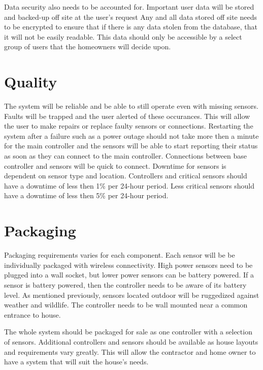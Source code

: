 \documentclass{report}
\begin{document}
Data security also needs to be accounted for. Important user data will be stored
and backed-up off site at the user's request Any and all data stored off site
needs to be encrypted to ensure that if there is any data stolen from the
database, that it will not be easily readable. This data should only be
accessible by a select group of users that the homeowners will decide upon.


\section{Quality}
The system will be reliable and be able to still operate even with missing
sensors. Faults will be trapped and the user alerted of these occurances.
This will allow the user to make repairs or replace faulty sensors or
connections. Restarting the system after a failure such as a power outage
should not take more then a minute for the main controller and the sensors
will be able to start reporting their status as soon as they can connect to
the main controller. Connections between base controller and sensors will be
quick to connect. Downtime for sensors is dependent on sensor type and
location. Controllers and critical sensors should have a downtime of less then
1\% per 24-hour period. Less critical sensors should have a downtime of less
then 5\% per 24-hour period. 

\section{Packaging}
Packaging requirements varies for each component. Each sensor will be
be individually packaged with wireless connectivity. High power sensors need to
be plugged into a wall socket, but lower power sensors can be battery powered.
If a sensor is battery powered, then the controller needs to be aware of its
battery level. As mentioned previously, sensors located outdoor will be
ruggedized against weather and wildlife. The controller needs to be wall
mounted near a common entrance to house.

The whole system should be packaged for sale as one controller with a selection
of sensors. Additional controllers and sensors should be available as house
layouts and requirements vary greatly. This will allow the contractor and home
owner to have a system that will suit the house's needs.
\end{document}
